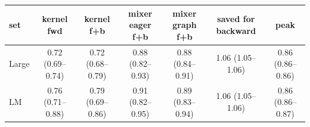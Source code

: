 \begin{tabular}{l c c c c c c }
\toprule
set & kernel fwd & kernel f+b & mixer eager f+b & mixer graph f+b & saved for backward & peak \\
\midrule
Large & 0.72 (0.69--0.74) & 0.72 (0.68--0.79) & 0.88 (0.82--0.93) & 0.88 (0.84--0.91) & 1.06 (1.05--1.06) & 0.86 (0.86--0.86) \\
LM & 0.76 (0.71--0.88) & 0.79 (0.69--0.86) & 0.91 (0.82--0.95) & 0.89 (0.83--0.94) & 1.06 (1.05--1.06) & 0.86 (0.86--0.87) \\
\bottomrule
\end{tabular}
